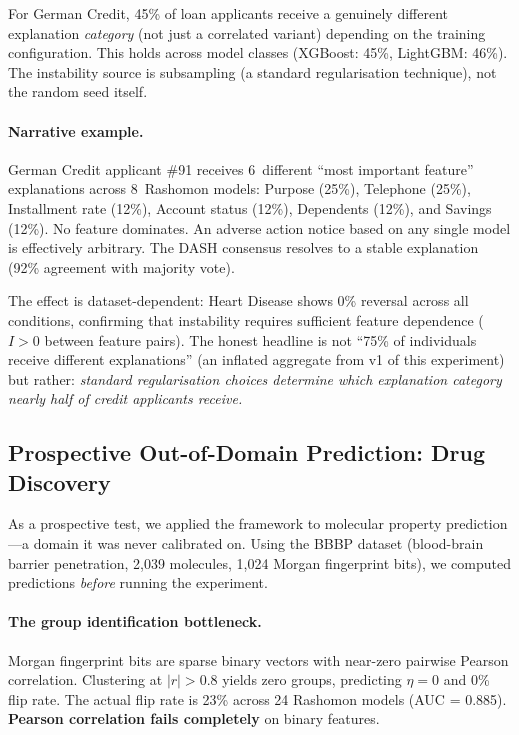 \documentclass[11pt,a4paper]{article}
\begin{document}
For German Credit, 45\% of loan applicants receive a genuinely different explanation \emph{category} (not just a correlated variant) depending on the training configuration. This holds across model classes (XGBoost: 45\%, LightGBM: 46\%). The instability source is subsampling (a standard regularisation technique), not the random seed itself.

\paragraph{Narrative example.}
German Credit applicant \#91 receives 6~different ``most important feature'' explanations across 8~Rashomon models: Purpose (25\%), Telephone (25\%), Installment rate (12\%), Account status (12\%), Dependents (12\%), and Savings (12\%). No feature dominates. An adverse action notice based on any single model is effectively arbitrary. The DASH consensus resolves to a stable explanation (92\% agreement with majority vote).

The effect is dataset-dependent: Heart Disease shows 0\% reversal across all conditions, confirming that instability requires sufficient feature dependence ($I > 0$ between feature pairs). The honest headline is not ``75\% of individuals receive different explanations'' (an inflated aggregate from v1 of this experiment) but rather: \emph{standard regularisation choices determine which explanation category nearly half of credit applicants receive.}

\subsection{Prospective Out-of-Domain Prediction: Drug Discovery}
\label{sec:drug-discovery}

As a prospective test, we applied the framework to molecular property prediction---a domain it was never calibrated on. Using the BBBP dataset (blood-brain barrier penetration, 2{,}039 molecules, 1{,}024 Morgan fingerprint bits), we computed predictions \emph{before} running the experiment.

\paragraph{The group identification bottleneck.}
Morgan fingerprint bits are sparse binary vectors with near-zero pairwise Pearson correlation. Clustering at $|r| > 0.8$ yields zero groups, predicting $\eta = 0$ and 0\% flip rate. The actual flip rate is 23\% across 24 Rashomon models (AUC = 0.885). \textbf{Pearson correlation fails completely} on binary features.
\end{document}

